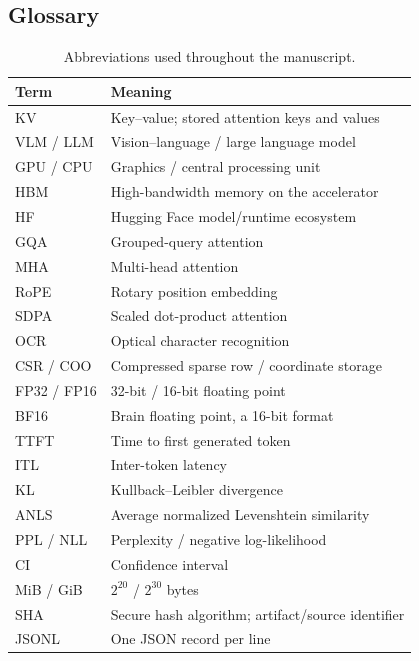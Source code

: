 \subsection{Glossary}
\begin{table}[h]
\caption{Abbreviations used throughout the manuscript.}
\small\begin{tabularx}{\columnwidth}{lY}\toprule
Term & Meaning\\\midrule
KV & Key--value; stored attention keys and values\\
VLM / LLM & Vision--language / large language model\\
GPU / CPU & Graphics / central processing unit\\
HBM & High-bandwidth memory on the accelerator\\
HF & Hugging Face model/runtime ecosystem\\
GQA & Grouped-query attention\\
MHA & Multi-head attention\\
RoPE & Rotary position embedding\\
SDPA & Scaled dot-product attention\\
OCR & Optical character recognition\\
CSR / COO & Compressed sparse row / coordinate storage\\
FP32 / FP16 & 32-bit / 16-bit floating point\\
BF16 & Brain floating point, a 16-bit format\\
TTFT & Time to first generated token\\
ITL & Inter-token latency\\
KL & Kullback--Leibler divergence\\
ANLS & Average normalized Levenshtein similarity\\
PPL / NLL & Perplexity / negative log-likelihood\\
CI & Confidence interval\\
MiB / GiB & $2^{20}$ / $2^{30}$ bytes\\
SHA & Secure hash algorithm; artifact/source identifier\\
JSONL & One JSON record per line\\
\bottomrule\end{tabularx}
\end{table}

